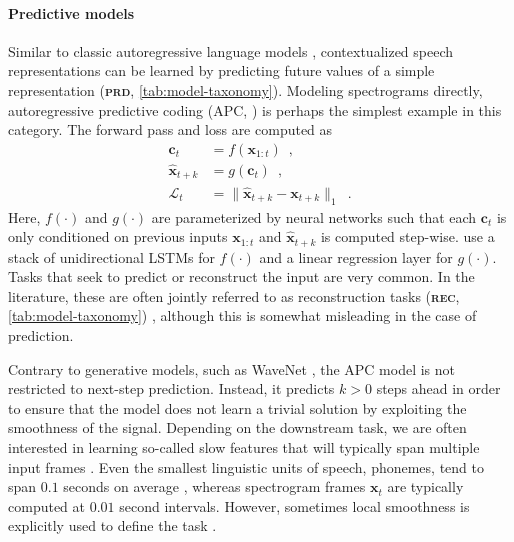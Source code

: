 {\paragraph{Predictive models}
Similar to classic autoregressive language models \parencite{mikolov_recurrent_2010}, contextualized speech representations can be learned by predicting future values of a simple representation \parencite{oord_representation_2018, chung_unsupervised_2019, schneider_wav2vec_2019, chung_generative_2020, jiang_further_2021} (\textbf{\textsc{prd}}, \cref{tab:model-taxonomy}). Modeling spectrograms directly, autoregressive predictive coding (APC, \citealp{chung_unsupervised_2019}) is perhaps the simplest example in this category. The forward pass and loss are computed as
\begin{align}
    \mathbf{c}_{t} &= f(\mathbf{x}_{1:t}) \enspace , \label{eq_brief:apc_f} \\ 
    \hat{\mathbf{x}}_{t+k} &= g(\mathbf{c}_{t})  \enspace , \\
    \mathcal{L}_t &= \lVert \hat{\mathbf{x}}_{t+k} - \mathbf{x}_{t+k} \rVert_1\enspace.
\end{align}
%
\noindent Here, $f(\cdot)$ and $g(\cdot)$ are parameterized by neural networks such that each $\mathbf{c}_t$ is only conditioned on previous inputs $\mathbf{x}_{1:t}$ and $\hat{\mathbf{x}}_{t+k}$ is computed step-wise. \textcite{chung_unsupervised_2019} use a stack of unidirectional LSTMs for $f(\cdot)$ and a linear regression layer for $g(\cdot)$. Tasks that seek to predict or reconstruct the input are very common. In the literature, these are often jointly referred to as reconstruction tasks (\textbf{\textsc{rec}}, \cref{tab:model-taxonomy}) \parencite{liu_tera_2021, wang_unispeech_2021}, although this is somewhat misleading in the case of prediction.

Contrary to generative models, such as WaveNet \parencite{oord_wavenet_2016}, the APC model is not restricted to next-step prediction. Instead, it predicts $k > 0$ steps ahead in order to ensure that the model does not learn a trivial solution by exploiting the smoothness of the signal. Depending on the downstream task, we are often interested in learning so-called slow features that will typically span multiple input frames \parencite{wiskott_slow_2002}. Even the smallest linguistic units of speech, phonemes, tend to span $0.1$ seconds on average \parencite{garofolo_timit_1993}, whereas spectrogram frames $\mathbf{x}_t$ are typically computed at $0.01$ second intervals. However, sometimes local smoothness is explicitly used to define the task \parencite{badino_autoencoder_2014, jati_speaker2vec_2017, jati_neural_2019}.

}
